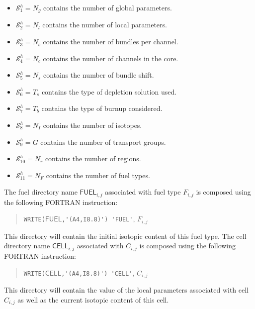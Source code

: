 \begin{itemize}
\item $\mathcal{S}^{h}_{1}=N_{g}$ contains the number of global parameters. 
\item $\mathcal{S}^{h}_{2}=N_{l}$ contains the number of local parameters. 
\item $\mathcal{S}^{h}_{3}=N_{b}$ contains the number of bundles per channel.  
\item $\mathcal{S}^{h}_{4}=N_{c}$ contains the number of channels in the core. 
\item $\mathcal{S}^{h}_{5}=N_{s}$ contains the number of bundle shift. 
\item $\mathcal{S}^{h}_{6}=T_{s}$ contains the type of depletion solution used. 
\item $\mathcal{S}^{h}_{7}=T_{b}$ contains the type of burnup considered. 
\item $\mathcal{S}^{h}_{8}=N_{I}$ contains the number of isotopes. 
\item $\mathcal{S}^{h}_{9}=G$ contains the number of transport groups. 
\item $\mathcal{S}^{h}_{10}=N_{r}$ contains the number of regions. 
\item $\mathcal{S}^{h}_{11}=N_{F}$ contains the number of fuel types. 
\end{itemize}

The fuel directory name $\mathsf{FUEL}_{i,j}$ associated with fuel type $F_{i,j}$ is composed using the following
FORTRAN instruction:
\begin{quote}
\verb|WRITE(|$\mathsf{FUEL}$\verb|,'(A4,I8.8)') |\verb|'FUEL'|, $F_{i,j}$
\end{quote} 
  This directory will contain the initial isotopic content of this fuel type. The cell directory name
$\mathsf{CELL}_{i,j}$ associated with $C_{i,j}$ is composed using the following FORTRAN instruction:
\begin{quote}
\verb|WRITE(|$\mathsf{CELL}$\verb|,'(A4,I8.8)') |\verb|'CELL'|, $C_{i,j}$
\end{quote} 
  This directory will contain the value of the local parameters associated with cell $C_{i,j}$ as well as
the current isotopic content of this cell.

